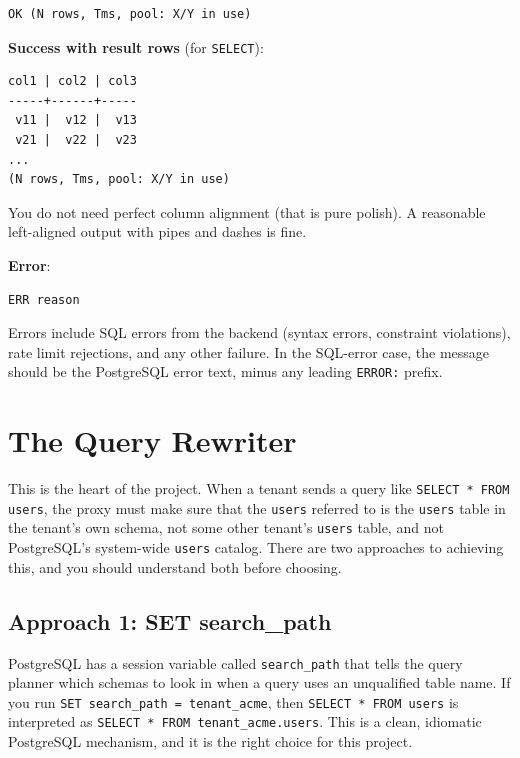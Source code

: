 \documentclass[11pt,a4paper]{article}
\begin{document}
\begin{codebox}
\begin{lstlisting}
OK (N rows, Tms, pool: X/Y in use)
\end{lstlisting}
\end{codebox}

\textbf{Success with result rows} (for \texttt{SELECT}):

\begin{codebox}
\begin{lstlisting}
col1 | col2 | col3
-----+------+-----
 v11 |  v12 |  v13
 v21 |  v22 |  v23
...
(N rows, Tms, pool: X/Y in use)
\end{lstlisting}
\end{codebox}

You do not need perfect column alignment (that is pure polish). A reasonable left-aligned output with pipes and dashes is fine.

\textbf{Error}:

\begin{codebox}
\begin{lstlisting}
ERR reason
\end{lstlisting}
\end{codebox}

Errors include SQL errors from the backend (syntax errors, constraint violations), rate limit rejections, and any other failure. In the SQL-error case, the message should be the PostgreSQL error text, minus any leading \texttt{ERROR:} prefix.

\section{The Query Rewriter}

This is the heart of the project. When a tenant sends a query like \texttt{SELECT * FROM users}, the proxy must make sure that the \texttt{users} referred to is the \texttt{users} table in the tenant's own schema, not some other tenant's \texttt{users} table, and not PostgreSQL's system-wide \texttt{users} catalog. There are two approaches to achieving this, and you should understand both before choosing.

\subsection{Approach 1: SET search\_path}
PostgreSQL has a session variable called \texttt{search\_path} that tells the query planner which schemas to look in when a query uses an unqualified table name. If you run \texttt{SET search\_path = tenant\_acme}, then \texttt{SELECT * FROM users} is interpreted as \texttt{SELECT * FROM tenant\_acme.users}. This is a clean, idiomatic PostgreSQL mechanism, and it is the right choice for this project.
\end{document}
